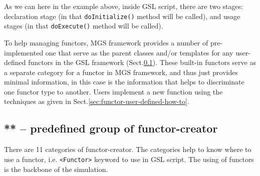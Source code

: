 As we can here in the example above, inside GSL script, there are two stages:
declaration stage (in that \verb!doInitialize()! method will be called), and
usage stages (in that \verb!doExecute()! method will be called).

To help managing functors, MGS framework provides a number of pre-implemented
one that serve as the parent classes and/or templates for any user-defined
functors in the GSL framework (Sect.\ref{sec:functor-built-in-framework}). These
built-in functors serve as a separate category for a functor in MGS framework,
and thus just provides minimal information, in this case is the information that
helps to discriminate one functor type to another. Users implement a new
function using the techniques as given in
Sect.\ref{sec:functor-user-defined-how-to}.

\subsection{** -- predefined group of functor-creator}
\label{sec:functor-built-in-framework}

There are 11 categories of functor-creator. The categories help to know where to
use a functor, i.e. \verb!<Functor>! keyword to use in GSL script. The using of
functors is the backbone of the simulation.

